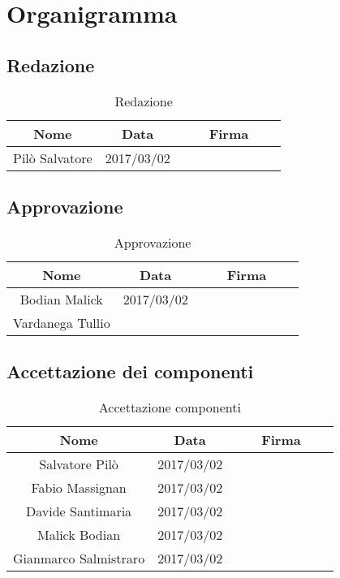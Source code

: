 \section{Organigramma}
	\subsection{Redazione}
	\begin{table}[H]
		\centering
		\begin{tabular}{|c|c|ccccc|}
			\hline
			\textbf{Nome}		& \textbf{Data}	&	&	& \textbf{Firma}	&	& \\
			\hline
			Pilò Salvatore		& 		2017/03/02		&     &     &     &     & \\
			\hline
		\end{tabular}
		\caption{Redazione}
	\end{table}
	\subsection{Approvazione}
	\begin{table}[H]
		\centering
		\begin{tabular}{|c|c|ccccc|}
			\hline
			\textbf{Nome}		& \textbf{Data}	&	&	& \textbf{Firma}	&	& \\
			\hline
			Bodian Malick		& 		2017/03/02		&     &     &     &     & \\
			Vardanega Tullio	& 				&     &     &     &     & \\
			\hline
		\end{tabular}
		\caption{Approvazione}
	\end{table}
	\subsection{Accettazione dei componenti}
	\begin{table}[H]
		\centering
		\begin{tabular}{|c|c|ccccc|}
			\hline
			\textbf{Nome}		& \textbf{Data}	&	&	& \textbf{Firma}	&	& \\
			\hline
			Salvatore Pilò			& 	2017/03/02	&     &     &     &     & \\
			Fabio Massignan			&	2017/03/02	&     &     &     &     & \\
			Davide Santimaria		&	2017/03/02	&     &     &     &     & \\
			Malick Bodian			& 	2017/03/02	&     &     &     &     & \\
			Gianmarco Salmistraro	&	2017/03/02	&     &     &     &     & \\
			\hline
		\end{tabular}
		\caption{Accettazione componenti}
	\end{table}

